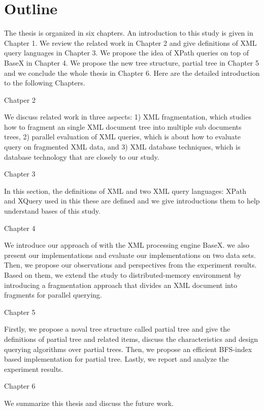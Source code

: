 \section{Outline}

The thesis is organized in six chapters. An introduction to this study is given
in Chapter 1. We  review the  related work in Chapter 2 and give definitions of
XML query languages in Chapter 3. We propose the idea of XPath queries on top of
BaseX in Chapter 4. We propose the new tree structure, partial tree in Chapter 5
and  we conclude the whole thesis in Chapter 6. Here are the detailed
introduction to the following Chapters.

Chatper 2

We discuss related work in three aspects: 1) XML fragmentation, which studies how
to fragment an single XML document tree into multiple sub documents trees, 2)
parallel evaluation of XML queries, which is about how to evaluate query on
fragmented XML data, and  3) XML database techniques, which is database
technology that are  closely to our study.

Chapter 3

In this section, the definitions of XML and two XML query languages: XPath and
XQuery used in this these are defined and we give introductions them to help
understand bases of this study.

Chapter 4

We introduce our approach of \cite{BoLS09} with the XML
processing engine BaseX. we also present our implementations and evaluate our
implementations on two data sets. Then, we propose our observations and 
perspectives from the experiment results. Based on them, we extend the study
to distributed-memory environment by introducing a fragmentation approach that
divides an XML document into fragments for parallel querying. 

Chapter 5

Firstly, we propose a noval tree structure called partial tree and give the 
definitions of partial tree and related items, discuss the characteristics 
and design querying algorithms over partial trees. Then, we propose an 
efficient BFS-index based implementation for partial tree. Lastly, we report 
and analyze the experiment results.

Chapter 6

We summarize this thesis and discuss the future work.
